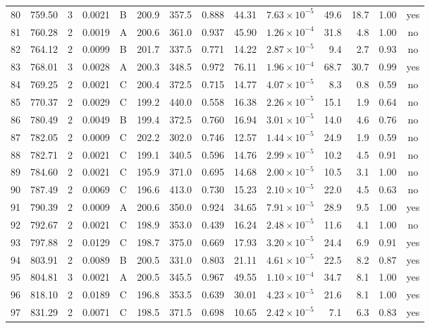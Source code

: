 \begin{landscape}
\begin{longtable}{rrrrlrrrrrrrrc}
80 & 759.50 & 3 & 0.0021 & B & 200.9 & 357.5 & 0.888 & 44.31 & $7.63\times10^{-5}$ & 49.6 & 18.7 & 1.00 & yes \\
81 & 760.28 & 2 & 0.0019 & A & 200.6 & 361.0 & 0.937 & 45.90 & $1.26\times10^{-4}$ & 31.8 & 4.8 & 1.00 & no \\
82 & 764.12 & 2 & 0.0099 & B & 201.7 & 337.5 & 0.771 & 14.22 & $2.87\times10^{-5}$ & 9.4 & 2.7 & 0.93 & no \\
83 & 768.01 & 3 & 0.0028 & A & 200.3 & 348.5 & 0.972 & 76.11 & $1.96\times10^{-4}$ & 68.7 & 30.7 & 0.99 & yes \\
84 & 769.25 & 2 & 0.0021 & C & 200.4 & 372.5 & 0.715 & 14.77 & $4.07\times10^{-5}$ & 8.3 & 0.8 & 0.59 & no \\
85 & 770.37 & 2 & 0.0029 & C & 199.2 & 440.0 & 0.558 & 16.38 & $2.26\times10^{-5}$ & 15.1 & 1.9 & 0.64 & no \\
86 & 780.49 & 2 & 0.0049 & B & 199.4 & 372.5 & 0.760 & 16.94 & $3.01\times10^{-5}$ & 14.0 & 4.6 & 0.76 & no \\
87 & 782.05 & 2 & 0.0009 & C & 202.2 & 302.0 & 0.746 & 12.57 & $1.44\times10^{-5}$ & 24.9 & 1.9 & 0.59 & no \\
88 & 782.71 & 2 & 0.0021 & C & 199.1 & 340.5 & 0.596 & 14.76 & $2.99\times10^{-5}$ & 10.2 & 4.5 & 0.91 & no \\
89 & 784.60 & 2 & 0.0021 & C & 195.9 & 371.0 & 0.695 & 14.68 & $2.00\times10^{-5}$ & 10.5 & 3.1 & 1.00 & no \\
90 & 787.49 & 2 & 0.0069 & C & 196.6 & 413.0 & 0.730 & 15.23 & $2.10\times10^{-5}$ & 22.0 & 4.5 & 0.63 & no \\
91 & 790.39 & 2 & 0.0009 & A & 200.6 & 350.0 & 0.924 & 34.65 & $7.91\times10^{-5}$ & 28.9 & 9.5 & 1.00 & yes \\
92 & 792.67 & 2 & 0.0021 & C & 198.9 & 353.0 & 0.439 & 16.24 & $2.48\times10^{-5}$ & 11.6 & 4.1 & 1.00 & no \\
93 & 797.88 & 2 & 0.0129 & C & 198.7 & 375.0 & 0.669 & 17.93 & $3.20\times10^{-5}$ & 24.4 & 6.9 & 0.91 & yes \\
94 & 803.91 & 2 & 0.0089 & B & 200.5 & 331.0 & 0.803 & 21.11 & $4.61\times10^{-5}$ & 22.5 & 8.2 & 0.87 & yes \\
95 & 804.81 & 3 & 0.0021 & A & 200.5 & 345.5 & 0.967 & 49.55 & $1.10\times10^{-4}$ & 34.7 & 8.1 & 1.00 & yes \\
96 & 818.10 & 2 & 0.0189 & C & 196.8 & 353.5 & 0.639 & 30.01 & $4.23\times10^{-5}$ & 21.6 & 8.1 & 1.00 & yes \\
97 & 831.29 & 2 & 0.0071 & C & 198.5 & 371.5 & 0.698 & 10.65 & $2.42\times10^{-5}$ & 7.1 & 6.3 & 0.83 & yes \\

\end{longtable}
\end{landscape}
